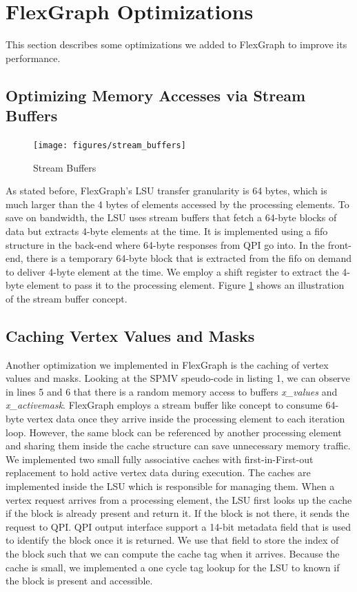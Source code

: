 \section{FlexGraph Optimizations}

This section describes some optimizations we added to FlexGraph to improve its performance. 

\subsection{Optimizing Memory Accesses via Stream Buffers}

\begin{figure}[htbp]
\centering
\texttt{[image: figures/stream\_buffers]}
\caption{Stream Buffers}
\label{fig:stream_buffers}
\end{figure}

As stated before, FlexGraph's LSU transfer granularity is 64 bytes, which is much larger than the 4 bytes of elements accessed by the processing elements. To save on bandwidth, the LSU uses stream buffers that fetch a 64-byte blocks of data but extracts 4-byte elements at the time. It is implemented using a fifo structure in the back-end where 64-byte responses from QPI go
 into. In the front-end, there is a temporary 64-byte block that is extracted from the fifo on demand to deliver 4-byte element at the time. We employ a shift register to extract the 4-byte element to pass it to the processing element. Figure \ref{fig:stream_buffers} shows an illustration of the stream buffer concept.
   
\subsection{Caching Vertex Values and Masks}

Another optimization we implemented in FlexGraph is the caching of vertex values and masks. Looking at the SPMV speudo-code in listing 1, we can observe in lines 5 and 6 that there is a random memory access to buffers \textit{x\_values} and \textit{x\_activemask}. FlexGraph employs a stream buffer like concept to consume 64-byte vertex data once they arrive inside the processing element to each iteration loop. However, the same block can be referenced by another processing element and sharing them inside the cache structure can save unnecessary memory traffic. We implemented two small fully associative caches with first-in-First-out replacement to hold active vertex data during execution. The caches are implemented inside the LSU which is responsible for managing them. When a vertex request arrives from a processing element, the LSU first looks up the cache if the block is already present and return it. If the block is not there, it sends the request to QPI. QPI output interface support a 14-bit metadata field that is used to identify the block once it is returned. We use that field to store the index of the block such that we can compute the cache tag when it arrives. Because the cache is small, we implemented a one cycle tag lookup for the LSU to known if the block is present and accessible.

